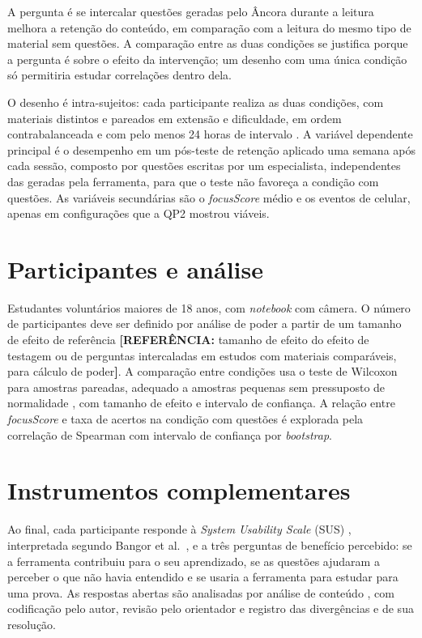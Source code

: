 \documentclass[portuguese,oneside]{tcc}
\newcommand{\ferramenta}{Âncora\xspace}
\newcommand{\estr}[1]{\emph{#1}}
\newcommand{\fs}{\emph{focusScore}\xspace}
\newcommand{\referencia}[1]{\textcolor{blue!60!black}{\textbf{[REFERÊNCIA:} #1\textbf{]}}}
\begin{document}
A pergunta é se intercalar questões geradas pelo \ferramenta durante a leitura melhora a retenção do conteúdo, em comparação com a leitura do mesmo tipo de material sem questões. A comparação entre as duas condições se justifica porque a pergunta é sobre o efeito da intervenção; um desenho com uma única condição só permitiria estudar correlações dentro dela.

O desenho é intra-sujeitos: cada participante realiza as duas condições, com materiais distintos e pareados em extensão e dificuldade, em ordem contrabalanceada e com pelo menos 24 horas de intervalo \cite{WRH12}. A variável dependente principal é o desempenho em um pós-teste de retenção aplicado uma semana após cada sessão, composto por questões escritas por um especialista, independentes das geradas pela ferramenta, para que o teste não favoreça a condição com questões. As variáveis secundárias são o \fs médio e os eventos de celular, apenas em configurações que a QP2 mostrou viáveis.

\section{Participantes e análise}

Estudantes voluntários maiores de 18 anos, com \estr{notebook} com câmera. O número de participantes deve ser definido por análise de poder a partir de um tamanho de efeito de referência \referencia{tamanho de efeito do efeito de testagem ou de perguntas intercaladas em estudos com materiais comparáveis, para cálculo de poder}. A comparação entre condições usa o teste de Wilcoxon para amostras pareadas, adequado a amostras pequenas sem pressuposto de normalidade \cite{Fie13}, com tamanho de efeito e intervalo de confiança. A relação entre \fs e taxa de acertos na condição com questões é explorada pela correlação de Spearman com intervalo de confiança por \estr{bootstrap}.

\section{Instrumentos complementares}

Ao final, cada participante responde à \estr{System Usability Scale} (SUS) \cite{Bro96}, interpretada segundo Bangor et al.\ \cite{BKM08}, e a três perguntas de benefício percebido: se a ferramenta contribuiu para o seu aprendizado, se as questões ajudaram a perceber o que não havia entendido e se usaria a ferramenta para estudar para uma prova. As respostas abertas são analisadas por análise de conteúdo \cite{Bar11}, com codificação pelo autor, revisão pelo orientador e registro das divergências e de sua resolução.
\end{document}
